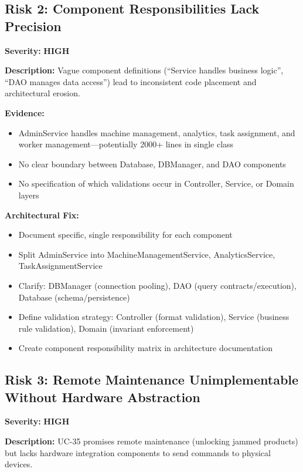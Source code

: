 \documentclass[11pt,a4paper]{article}
\begin{document}
\subsection{Risk 2: Component Responsibilities Lack Precision}

\textbf{Severity:} \textbf{HIGH}

\textbf{Description:} Vague component definitions (``Service handles business logic'', ``DAO manages data access'') lead to inconsistent code placement and architectural erosion.

\textbf{Evidence:}
\begin{itemize}
    \item AdminService handles machine management, analytics, task assignment, and worker management—potentially 2000+ lines in single class
    \item No clear boundary between Database, DBManager, and DAO components
    \item No specification of which validations occur in Controller, Service, or Domain layers
\end{itemize}

\textbf{Architectural Fix:}
\begin{itemize}
    \item Document specific, single responsibility for each component
    \item Split AdminService into MachineManagementService, AnalyticsService, TaskAssignmentService
    \item Clarify: DBManager (connection pooling), DAO (query contracts/execution), Database (schema/persistence)
    \item Define validation strategy: Controller (format validation), Service (business rule validation), Domain (invariant enforcement)
    \item Create component responsibility matrix in architecture documentation
\end{itemize}

\subsection{Risk 3: Remote Maintenance Unimplementable Without Hardware Abstraction}

\textbf{Severity:} \textbf{HIGH}

\textbf{Description:} UC-35 promises remote maintenance (unlocking jammed products) but lacks hardware integration components to send commands to physical devices.
\end{document}
